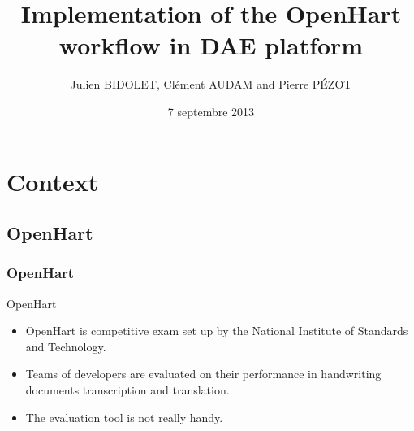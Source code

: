 \documentclass[c]{beamer}
\title[Intermediary defense of Industrial Project]{Implementation of the OpenHart workflow in DAE platform}
\author{Julien BIDOLET, Clément AUDAM and Pierre P\'EZOT }
\date{7 septembre 2013}
\institute{TELECOM Nancy}
\begin{document}
\begin{frame}
  \maketitle
\end{frame}

\begin{frame}
  \tableofcontents
\end{frame}



\section{Context}
\subsection{OpenHart}
\begin{frame}
	\frametitle{OpenHart}
	\begin{block}{OpenHart}
	\begin{itemize}
		\item OpenHart is competitive exam set up by the National Institute of Standards and Technology.
		\item Teams of developers are evaluated on their performance in handwriting documents transcription and translation.
		\item The evaluation tool is not really handy.
	\end{itemize}
	\end{block}
\end{frame}
\end{document}
